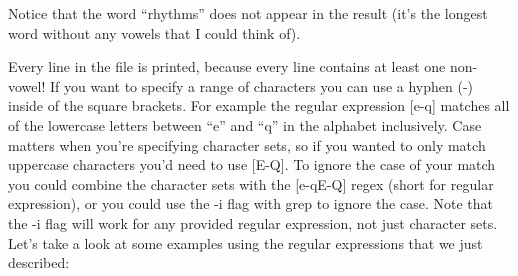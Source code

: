 Notice that the word “rhythms” does not appear in the result (it’s the longest word without any vowels that I could think of).

Every line in the file is printed, because every line contains at least one non-vowel! If you want to specify a range of characters you can use a hyphen (-) inside of the square brackets. For example the regular expression [e-q] matches all of the lowercase letters between “e” and “q” in the alphabet inclusively. Case matters when you’re specifying character sets, so if you wanted to only match uppercase characters you’d need to use [E-Q]. To ignore the case of your match you could combine the character sets with the [e-qE-Q] regex (short for regular expression), or you could use the -i flag with grep to ignore the case. Note that the -i flag will work for any provided regular expression, not just character sets. Let’s take a look at some examples using the regular expressions that we just described:

